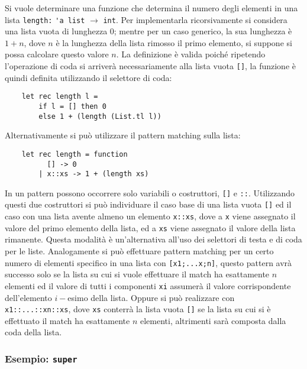 \documentclass{article}
\numberwithin{equation}{subsection}
\begin{document}
Si vuole determinare una funzione che determina il numero degli elementi in una lista \verb|length:| \verb|'a list| $\rightarrow$ \verb|int|. Per implementarla ricorsivamente si considera una lista vuota di lunghezza 0; mentre per un caso generico, la sua lunghezza è $1+n$, dove $n$ è la lunghezza della lista rimosso il primo elemento, si suppone si possa calcolare questo valore $n$. 
La definizione è valida poiché ripetendo l'operazione di coda si arriverà necessariamente alla lista vuota \verb|[]|, la funzione è quindi definita utilizzando il selettore di coda:
\begin{verbatim}
    let rec length l = 
        if l = [] then 0
        else 1 + (length (List.tl l))
\end{verbatim}
Alternativamente si può utilizzare il pattern matching sulla lista:
\begin{verbatim}
    let rec length = function
          [] -> 0
        | x::xs -> 1 + (length xs)
\end{verbatim}
In un pattern possono occorrere solo variabili o costruttori, \verb|[]| e \verb|::|. Utilizzando questi due costruttori si può individuare il caso base di una lista vuota \verb|[]| ed il caso con una lista avente almeno un elemento \verb|x::xs|, dove a \verb|x| viene assegnato il valore del primo elemento della lista, ed a \verb|xs| viene assegnato il valore della lista rimanente. 
Questa modalità è un'alternativa all'uso dei selettori di testa e di coda per le liste. Analogamente si può effettuare pattern matching per un certo numero di elementi specifico in una lista con \verb|[x1;...x;n]|, questo pattern avrà successo solo se la lista su cui si vuole effettuare il match ha esattamente $n$ elementi ed il valore di tutti i componenti \verb|xi| assumerà il valore corrispondente dell'elemento $i-$esimo della lista. Oppure si può realizzare con \verb|x1::...::xn::xs|, dove \verb|xs| conterrà la lista vuota \verb|[]| se la lista su cui si è effettuato il match ha esattamente $n$ elementi, altrimenti sarà composta dalla coda della lista. 

\subsubsection*{Esempio: \texttt{super}}
\end{document}
